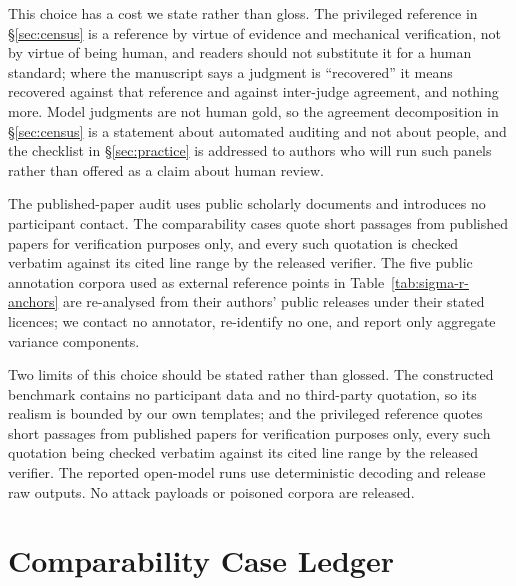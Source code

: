 \documentclass[11pt]{article}
\begin{document}
This choice has a cost we state rather than gloss. The privileged reference in
\S\ref{sec:census} is a reference by virtue of evidence and mechanical
verification, not by virtue of being human, and readers should not substitute it
for a human standard; where the manuscript says a judgment is ``recovered'' it
means recovered against that reference and against inter-judge agreement, and
nothing more. Model judgments are not human gold, so the agreement decomposition
in \S\ref{sec:census} is a statement about automated auditing and not about
people, and the checklist in \S\ref{sec:practice} is addressed to authors who
will run such panels rather than offered as a claim about human review.

The published-paper audit uses public scholarly documents and introduces no
participant contact. The comparability cases quote short passages from published
papers for verification purposes only, and every such quotation is checked
verbatim against its cited line range by the released verifier. The five public
annotation corpora used as external reference points in
Table~\ref{tab:sigma-r-anchors} are re-analysed from their authors' public
releases under their stated licences; we contact no annotator, re-identify no
one, and report only aggregate variance components.

Two limits of this choice should be stated rather than glossed. The constructed
benchmark contains no participant data and no third-party quotation, so its
realism is bounded by our own templates; and the privileged reference quotes
short passages from published papers for verification purposes only, every such
quotation being checked verbatim against its cited line range by the released
verifier. The reported open-model runs use deterministic decoding and release
raw outputs. No attack payloads or poisoned corpora are released.

\clearpage


\clearpage
\appendix



\FloatBarrier
\section{Comparability Case Ledger}
\label{sec:appendix-cases}




\end{document}
